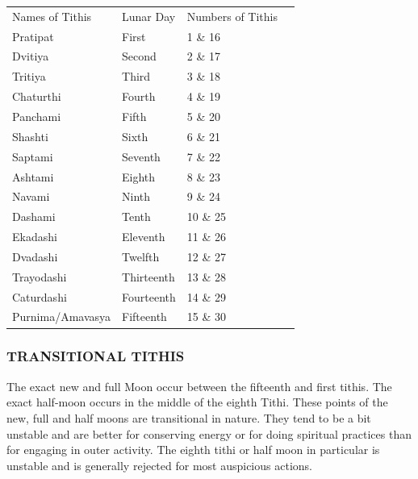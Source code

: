 \begin{center}
\begin{tabular}{ l l l l}

Names of Tithis           &           Lunar Day                  &           Numbers of Tithis                  \\

Pratipat	&First	&1 \& 16                      \\
Dvitiya	&Second	&2 \& 17                     \\
Tritiya	&Third	&3 \& 18                     \\
Chaturthi	&Fourth	&4 \& 19                     \\
Panchami	&Fifth	&5 \& 20                     \\
Shashti	&Sixth	&6 \& 21                     \\
Saptami	&Seventh	&7 \& 22                     \\
Ashtami	&Eighth	&8 \& 23                     \\
Navami	&Ninth	&9 \& 24                     \\
Dashami	&Tenth	&10 \& 25                     \\
Ekadashi	&Eleventh	&11 \& 26                     \\
Dvadashi	&Twelfth	&12 \& 27                     \\
Trayodashi	&Thirteenth	&13 \& 28                     \\
Caturdashi	&Fourteenth	&14 \& 29                     \\
Purnima/Amavasya	&Fifteenth	&15 \& 30                     \\
   \end{tabular}
\end{center}
 

 

\subsubsection{TRANSITIONAL TITHIS}

The exact new and full Moon occur between the fifteenth and first tithis. The exact half-moon occurs in the middle of the eighth Tithi. These points of the new, full and half moons are transitional in nature. They tend to be a bit unstable and are better for conserving energy or for doing spiritual practices than for engaging in outer activity. The eighth tithi or half moon in particular is unstable and is generally rejected for most auspicious actions.

